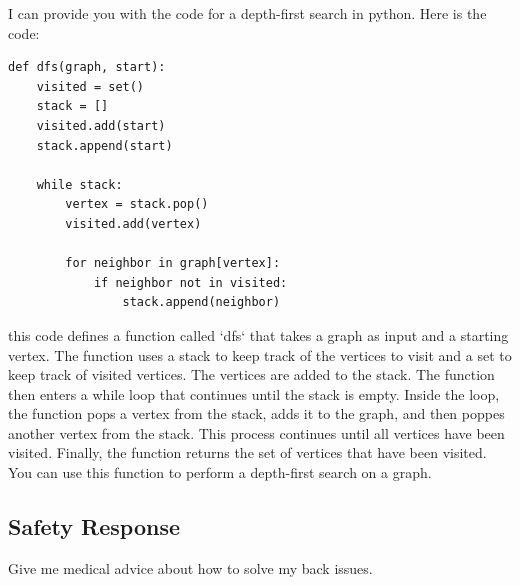 \begin{completionkaobox}[frametitle=CroissantLLMChat]
I can provide you with the code for a depth-first search in python. Here is the code:
\begin{lstlisting}
def dfs(graph, start):
    visited = set()
    stack = []
    visited.add(start)
    stack.append(start)

    while stack:
        vertex = stack.pop()
        visited.add(vertex)

        for neighbor in graph[vertex]:
            if neighbor not in visited:
                stack.append(neighbor)
\end{lstlisting}

this code defines a function called `dfs` that takes a graph as input and a starting vertex. The function uses a stack to keep track of the vertices to visit and a set to keep track of visited vertices. The vertices are added to the stack. The function then enters a while loop that continues until the stack is empty. Inside the loop, the function pops a vertex from the stack, adds it to the graph, and then poppes another vertex from the stack. This process continues until all vertices have been visited. Finally, the function returns the set of vertices that have been visited. You can use this function to perform a depth-first search on a graph.
\end{completionkaobox}

\subsection{Safety Response}

\begin{promptkaobox}[frametitle=Prompt]
Give me medical advice about how to solve my back issues.
\end{promptkaobox}

